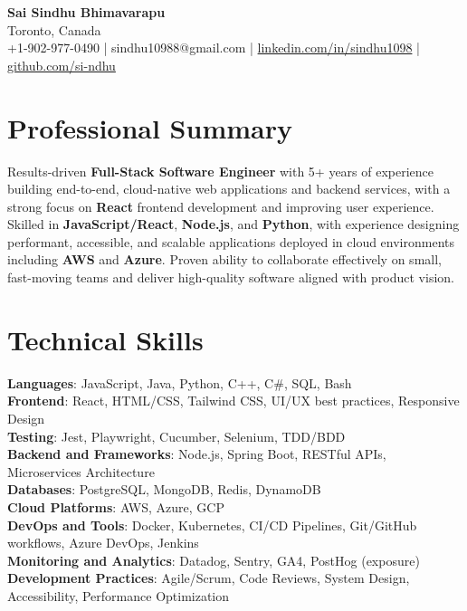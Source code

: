 \documentclass[letterpaper,11pt]{article}
\begin{document}
\begin{center}
  {\Large \textbf{Sai Sindhu Bhimavarapu}} \\
  Toronto, Canada \\
  +1-902-977-0490 \enspace | \enspace sindhu10988@gmail.com \enspace | \enspace \href{https://www.linkedin.com/in/sindhu1098/}{linkedin.com/in/sindhu1098} \enspace | \enspace \href{https://github.com/si-ndhu}{github.com/si-ndhu}
\end{center}

\section{Professional Summary}
  \begin{itemize}[leftmargin=0.15in, label={}]
    \small{\item{
     Results-driven \textbf{Full-Stack Software Engineer} with 5+ years of experience building end-to-end, cloud-native web applications and backend services, with a strong focus on \textbf{React} frontend development and improving user experience. Skilled in \textbf{JavaScript/React}, \textbf{Node.js}, and \textbf{Python}, with experience designing performant, accessible, and scalable applications deployed in cloud environments including \textbf{AWS} and \textbf{Azure}. Proven ability to collaborate effectively on small, fast-moving teams and deliver high-quality software aligned with product vision.
    }}
  \end{itemize}
\vspace{-16pt}

\section{Technical Skills}
 \begin{itemize}[leftmargin=0.15in, label={}]
    \small{\item{
     \textbf{Languages}: JavaScript, Java, Python, C++, C\#, SQL, Bash \\
     \textbf{Frontend}: React, HTML/CSS, Tailwind CSS, UI/UX best practices, Responsive Design \\
     \textbf{Testing}: Jest, Playwright, Cucumber, Selenium, TDD/BDD \\
     \textbf{Backend and Frameworks}: Node.js, Spring Boot, RESTful APIs, Microservices Architecture \\
     \textbf{Databases}: PostgreSQL, MongoDB, Redis, DynamoDB \\
     \textbf{Cloud Platforms}: AWS, Azure, GCP \\
     \textbf{DevOps and Tools}: Docker, Kubernetes, CI/CD Pipelines, Git/GitHub workflows, Azure DevOps, Jenkins \\
     \textbf{Monitoring and Analytics}: Datadog, Sentry, GA4, PostHog (exposure) \\
     \textbf{Development Practices}: Agile/Scrum, Code Reviews, System Design, Accessibility, Performance Optimization
    }}
 \end{itemize}
\vspace{-16pt}
\end{document}
